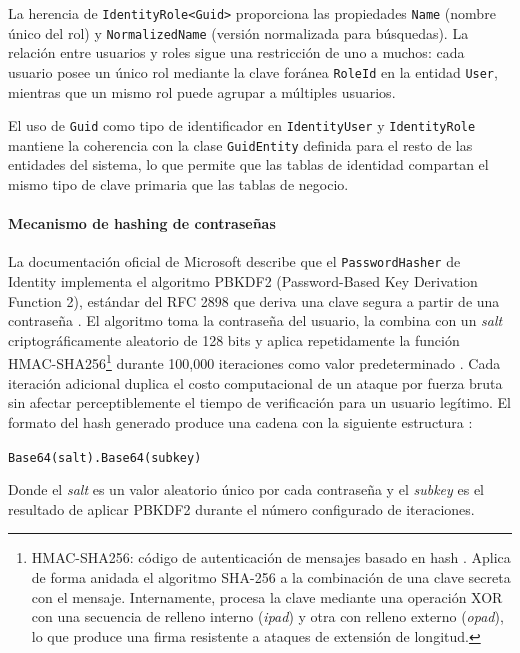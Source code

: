 La herencia de \texttt{IdentityRole<Guid>} proporciona las propiedades \texttt{Name} (nombre único del rol) y \texttt{NormalizedName} (versión normalizada para búsquedas). 
La relación entre usuarios y roles sigue una restricción de uno a muchos: cada usuario posee un único rol mediante la clave foránea \texttt{RoleId} en la entidad \texttt{User}, mientras que un mismo rol puede agrupar a múltiples usuarios.


El uso de \texttt{Guid} como tipo de identificador en \texttt{IdentityUser} y \texttt{IdentityRole} mantiene la coherencia con la clase \texttt{GuidEntity} definida para el resto de las entidades del sistema, lo que permite que las tablas de identidad compartan el mismo tipo de clave primaria que las tablas de negocio.


\paragraph{Mecanismo de hashing de contraseñas}

La documentación oficial de Microsoft describe que el \texttt{PasswordHasher} de Identity implementa el algoritmo PBKDF2 (Password-Based Key Derivation Function 2), estándar del RFC 2898 que deriva una clave segura a partir de una contraseña \cite{rfc2898}. 
El algoritmo toma la contraseña del usuario, la combina con un \textit{salt} criptográficamente aleatorio de 128 bits y aplica repetidamente la función HMAC-SHA256\footnote{HMAC-SHA256: código de autenticación de mensajes basado en hash \cite{rfc2104}. Aplica de forma anidada el algoritmo SHA-256 a la combinación de una clave secreta con el mensaje. Internamente, procesa la clave mediante una operación XOR con una secuencia de relleno interno (\textit{ipad}) y otra con relleno externo (\textit{opad}), lo que produce una firma resistente a ataques de extensión de longitud.}
durante 100,000 iteraciones como valor predeterminado \cite{microsoft_password_hasher}. Cada iteración adicional duplica el costo computacional de un ataque por fuerza bruta sin afectar perceptiblemente el tiempo de verificación para un usuario legítimo. El formato del hash generado produce una cadena con la siguiente estructura \cite{microsoft_hash_format}:

\begin{center}
\texttt{Base64(salt).Base64(subkey)}
\end{center}

Donde el \textit{salt} es un valor aleatorio único por cada contraseña y el \textit{subkey} es el resultado de aplicar PBKDF2 durante el número configurado de iteraciones.

